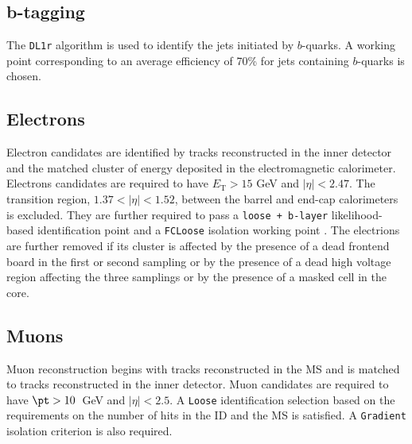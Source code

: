 \subsection{b-tagging}
The {\tt\scriptsize DL1r} \cite{btag1} algorithm is used to identify the jets initiated by $b$-quarks. A working point corresponding to an average efficiency of 70\% for jets containing $b$-quarks is chosen.

\subsection{Electrons}
Electron candidates are identified by tracks reconstructed in the inner detector and the matched cluster of energy deposited in the electromagnetic calorimeter. Electrons candidates are required to have $E_{\text{T}} > 15$ GeV and $|\eta|<2.47$. The transition region, $1.37<|\eta|<1.52$, between the barrel and end-cap calorimeters is excluded. They are further required to pass a \texttt{loose + b-layer} likelihood-based identification point \cite{ElectronID} and a \texttt{FCLoose} isolation working point \cite{IsolationWP}. The electrions are further removed  if its cluster is affected by the presence of a dead frontend board in the first or second sampling or by the presence of a dead high voltage region affecting the three samplings or by the presence of a masked cell in the core.

\subsection{Muons}
Muon reconstruction begins with tracks reconstructed in the MS and is matched to tracks reconstructed in the inner detector. Muon candidates are required to have $\pt>10$~GeV and $|\eta|<2.5$. A \texttt{Loose} identification selection \cite{MuonSelectionTool} based on the requirements on the number of hits in the ID and the MS is satisfied. A \texttt{Gradient} isolation \cite{IsolationWP} criterion is also required.

